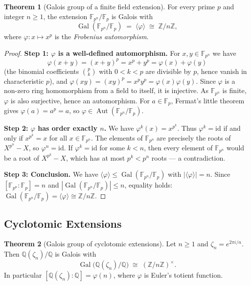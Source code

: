 \documentclass[12pt,a4paper,openany]{book}
\theoremstyle{definition}
\newtheorem{theorem}{Theorem}[chapter]
\theoremstyle{remark}
\newcommand{\Z}{\mathbb{Z}}
\newcommand{\Q}{\mathbb{Q}}
\newcommand{\F}{\mathbb{F}}
\DeclareMathOperator{\Gal}{Gal}
\DeclareMathOperator{\Aut}{Aut}
\begin{document}
\begin{theorem}[Galois group of a finite field extension]\label{thm:gal-finite-field}
For every prime $p$ and integer $n\geq 1$, the extension $\F_{p^{n}}/\F_{p}$
is Galois with
\[
  \Gal(\F_{p^{n}}/\F_{p})
  \;=\;\langle\varphi\rangle
  \;\cong\;\Z/n\Z,
\]
where $\varphi\colon x\mapsto x^{p}$ is the \emph{Frobenius automorphism}.
\end{theorem}

\begin{proof}
\textbf{Step 1: $\varphi$ is a well-defined automorphism.}\;
For $x,y\in\F_{p^{n}}$ we have
\[
  \varphi(x+y)=(x+y)^{p}=x^{p}+y^{p}=\varphi(x)+\varphi(y)
\]
(the binomial coefficients $\binom{p}{k}$ with $0<k<p$ are divisible by $p$,
hence vanish in characteristic $p$), and
$\varphi(xy)=(xy)^{p}=x^{p}y^{p}=\varphi(x)\varphi(y)$.  Since $\varphi$
is a non-zero ring homomorphism from a field to itself, it is injective.
As $\F_{p^{n}}$ is finite, $\varphi$ is also surjective, hence an
automorphism.  For $a\in\F_{p}$, Fermat's little theorem gives
$\varphi(a)=a^{p}=a$, so $\varphi\in\Aut(\F_{p^{n}}/\F_{p})$.

\medskip\noindent
\textbf{Step 2: $\varphi$ has order exactly $n$.}\;
We have $\varphi^{k}(x)=x^{p^{k}}$.  Thus $\varphi^{k}=\mathrm{id}$ if
and only if $x^{p^{k}}=x$ for all $x\in\F_{p^{n}}$.  The elements of
$\F_{p^{n}}$ are precisely the roots of $X^{p^{n}}-X$, so $\varphi^{n}=
\mathrm{id}$.  If $\varphi^{k}=\mathrm{id}$ for some $k<n$, then every
element of $\F_{p^{n}}$ would be a root of $X^{p^{k}}-X$, which has at most
$p^{k}<p^{n}$ roots — a contradiction.

\medskip\noindent
\textbf{Step 3: Conclusion.}\;
We have $\langle\varphi\rangle\leq\Gal(\F_{p^{n}}/\F_{p})$ with
$|\langle\varphi\rangle|=n$.  Since $[\F_{p^{n}}:\F_{p}]=n$ and
$|\Gal(\F_{p^{n}}/\F_{p})|\leq n$, equality holds:
$\Gal(\F_{p^{n}}/\F_{p})=\langle\varphi\rangle\cong\Z/n\Z$.
\end{proof}

\subsection{Cyclotomic Extensions}
\label{subsec:cyclotomic}

\begin{theorem}[Galois group of cyclotomic extensions]\label{thm:gal-cyclotomic}
Let $n\geq 1$ and $\zeta_{n}=e^{2\pi i/n}$.  Then $\Q(\zeta_{n})/\Q$ is
Galois with
\[
  \Gal\!\bigl(\Q(\zeta_{n})/\Q\bigr)
  \;\cong\; (\Z/n\Z)^{\times}.
\]
In particular $[\Q(\zeta_{n}):\Q]=\varphi(n)$, where $\varphi$ is Euler's
totient function.
\end{theorem}
\end{document}
